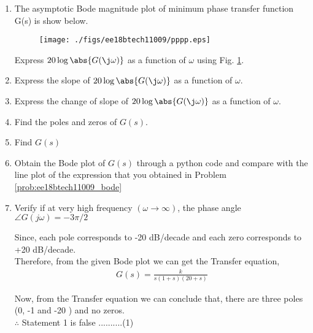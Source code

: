 \begin{enumerate}[label=\thesubsection.\arabic*.,ref=\thesubsection.\theenumi]
\item 
The asymptotic Bode magnitude plot of  minimum phase transfer function
G(s) is show below.
\begin{figure}[htp]
	\centering
	\texttt{[image: ./figs/ee18btech11009/pppp.eps]}
	\caption{}
	\label{fig:ee18btech11009_bode}
\end{figure} 
%
Express $20\log\abs{G(\j\omega)}$ as a function of $\omega$ using Fig. \ref{fig:ee18btech11009_bode}.
\label{prob:ee18btech11009_bode}
\item Express the slope of $20\log\abs{G(\j\omega)}$ as a function of $\omega$. 
\item Express the change of slope of $20\log\abs{G(\j\omega)}$ as a function of $\omega$. 
\item Find the poles and zeros of $G(s)$.
\item Find $G(s)$
\item Obtain the Bode plot of $G(s)$ through a python code and compare with the line plot of the expression that you obtained in Problem \ref{prob:ee18btech11009_bode}
\item  Verify if at very high frequency $(\omega \to \infty)$, the phase angle $ \angle G(j\omega)=-3\pi/2$
\solution

Since, each pole corresponds to -20 dB/decade  
and each zero corresponds to +20 dB/decade.\\
Therefore, from the given Bode plot we can get the Transfer equation,
\begin{align}
G(s) = \frac{k}{s(1+s)(20+s)}
\end{align}

Now, from the Transfer equation we can conclude that,
there are three poles (0, -1 and -20 ) and no zeros.\\

$\therefore$ Statement 1 is false  ..........(1)\\ \\



\end{enumerate}
